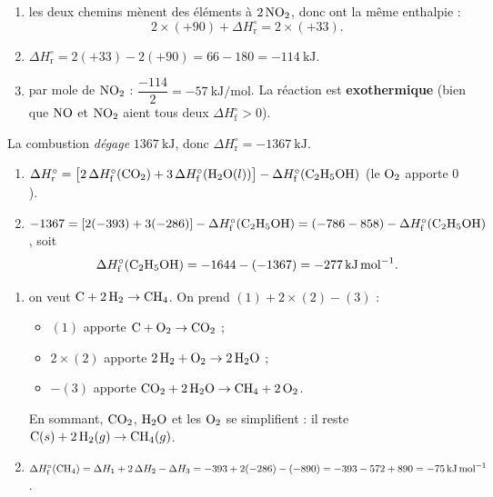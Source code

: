 \documentclass[11pt,a4paper]{article}
\begin{document}
\begin{corrige}
\begin{enumerate}[label=\alph*)]
  \item les deux chemins mènent des éléments à $2\,\ce{NO2}$, donc ont la même enthalpie :
  \[ 2\times(+90) + \Delta H^\circ_{\text{r}} = 2\times(+33). \]
  \item $\Delta H^\circ_{\text{r}} = 2(+33) - 2(+90) = 66 - 180 = \qty{-114}{\kilo\joule}$.
  \item par mole de $\ce{NO2}$ : $\dfrac{-114}{2} = \qty{-57}{\kilo\joule\per\mol}$. La réaction est \textbf{exothermique} (bien que $\ce{NO}$ et $\ce{NO2}$ aient tous deux $\Delta H^\circ_{\text{f}}>0$).
\end{enumerate}
\end{corrige}

\begin{corrige}
La combustion \emph{dégage} $\qty{1367}{\kilo\joule}$, donc $\Delta H^\circ_{\text{r}} = \qty{-1367}{\kilo\joule}$.
\begin{enumerate}[label=\alph*)]
  \item $\Delta H^\circ_{\text{r}} = \big[2\,\Delta H^\circ_{\text{f}}(\ce{CO2}) + 3\,\Delta H^\circ_{\text{f}}(\ce{H2O}(l))\big] - \Delta H^\circ_{\text{f}}(\ce{C2H5OH})$ \; (le $\ce{O2}$ apporte $0$).
  \item $-1367 = [2(-393) + 3(-286)] - \Delta H^\circ_{\text{f}}(\ce{C2H5OH}) = (-786 - 858) - \Delta H^\circ_{\text{f}}(\ce{C2H5OH})$, soit
  \[ \Delta H^\circ_{\text{f}}(\ce{C2H5OH}) = -1644 - (-1367) = \qty{-277}{\kilo\joule\per\mol}. \]
\end{enumerate}
\end{corrige}

\begin{corrige}
\begin{enumerate}[label=\alph*)]
  \item on veut $\ce{C} + 2\,\ce{H2} \rightarrow \ce{CH4}$. On prend $(1) + 2\times(2) - (3)$ :
  \begin{itemize}[leftmargin=1.4em,topsep=1pt,itemsep=0.5pt]
    \item $(1)$ apporte $\ce{C} + \ce{O2} \rightarrow \ce{CO2}$ ;
    \item $2\times(2)$ apporte $2\,\ce{H2} + \ce{O2} \rightarrow 2\,\ce{H2O}$ ;
    \item $-(3)$ apporte $\ce{CO2} + 2\,\ce{H2O} \rightarrow \ce{CH4} + 2\,\ce{O2}$.
  \end{itemize}
  En sommant, $\ce{CO2}$, $\ce{H2O}$ et les $\ce{O2}$ se simplifient : il reste $\ce{C}(s) + 2\,\ce{H2}(g) \rightarrow \ce{CH4}(g)$.
  \item $\Delta H^\circ_{\text{f}}(\ce{CH4}) = \Delta H_1 + 2\,\Delta H_2 - \Delta H_3 = -393 + 2(-286) - (-890) = -393 - 572 + 890 = \qty{-75}{\kilo\joule\per\mol}$.
\end{enumerate}
\end{corrige}
\end{document}
